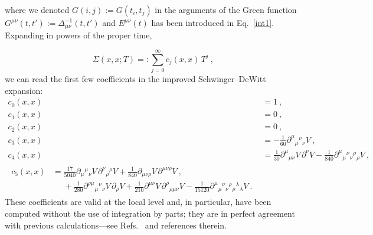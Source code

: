 \documentclass[12pt,a4paper]{article}
\numberwithin{equation}{section}
\numberwithin{equation}{section}
\begin{document}
where we denoted $G(i,j):=G(t_i,t_j)$ in the arguments of the Green function $G^{\mu\nu}(t,t'):=\Delta^{-1}_{\mu\nu}(t,t')$ and $E^{\mu\nu}(t)$ has been introduced in Eq.~\eqref{int1}. Expanding in powers of the proper time,

\begin{equation}\label{eq:generalized_coeff}
\Sigma(x,x;T)=:\sum_{j=0}^{\infty} c_j(x,x) \, T^{j}\ ,
\end{equation}
we can read the first few coefficients in the improved Schwinger--DeWitt expansion: 
\begin{align}
c_0(x,x)&=1\ , \\
c_1(x,x)&=0\ , \\
c_2(x,x)&=0\ , \\
c_3(x,x)&=-\frac{1}{60} \partial^\mu{}_\mu{}^\nu{}_\nu V\ , \\
c_4(x,x)&=\frac{1}{30} \partial^{\mu}{}_{\mu\nu} V \, \partial^\nu V- \frac{1}{840} \partial^\mu{}_\mu{}^\nu{}_\nu{}^\rho{}_\rho V \ , \\
\begin{split}
c_5(x,x)&=\frac{17}{5040} \partial_\mu{}^\mu{}_\nu V \, \partial^\nu{}_\rho{}^\rho V +\frac{1}{840} \partial_{\mu\nu\rho} V \, \partial^{\mu\nu\rho} V\ , \\
&\phantom{=}+\frac{1}{280} \partial^{\rho\mu}{}_\mu{}^\nu{}_\nu V \, \partial_\rho V + \frac{1}{210} \partial^{\mu\nu} V \, \partial^\rho{}_{\rho\mu\nu} V -\frac{1}{15120}\partial^\mu{}_\mu{}^\nu{}_\nu{}^\rho{}_\rho{}^\lambda{}_\lambda V\ .
\end{split}
\end{align}
These coefficients are valid at the local level and, in particular, have been computed without the use of integration by parts; they are in perfect agreement with previous calculations---see Refs.~\cite{Franchino-Vinas:2023wea, Franchino-Vinas:2024wof} and references therein.
\end{document}
